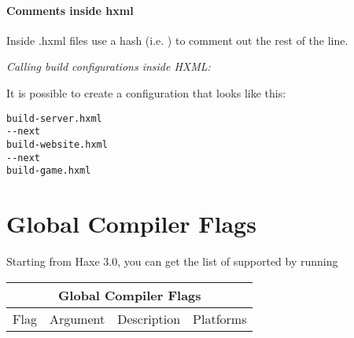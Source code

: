 \paragraph{Comments inside hxml}

Inside .hxml files use a hash (i.e. \ic{\#}) to comment out the rest of the line. 

\emph{Calling build configurations inside HXML:}

It is possible to create a configuration that looks like this:

\begin{lstlisting}
build-server.hxml  
--next  
build-website.hxml  
--next  
build-game.hxml
\end{lstlisting}


\section{Global Compiler Flags}
\label{compiler-usage-flags}

Starting from Haxe 3.0, you can get the list of supported  by running 

\begin{center}
\begin{tabular}{| l | l | l | l |}
	\hline
	\multicolumn{4}{|c|}{Global Compiler Flags} \\ \hline
	Flag & Argument & Description & Platforms \\ \hline
	
\end{tabular}
\end{center}

